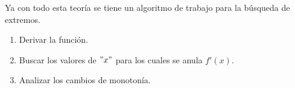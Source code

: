 \documentclass[10pt,twoside]{SelfArx} %
\begin{document}
   Ya con todo esta teor\'ia se tiene un algoritmo de trabajo para la búsqueda de extremos.
   \begin{enumerate}
   	\item Derivar la funci\'on.
   	\item Buscar los valores de $ "x" $ para los cuales se anula $ f'(x) $.
   	\item Analizar los cambios de monotonía.
   \end{enumerate}
%   
\end{document}
